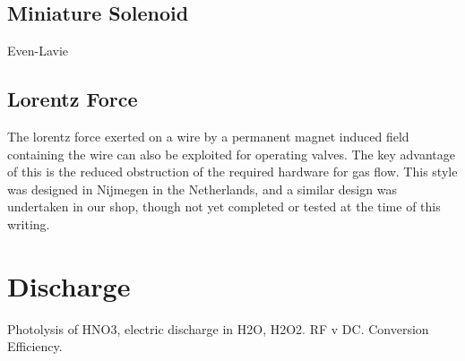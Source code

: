 \subsection{Miniature Solenoid}

Even-Lavie

\subsection{Lorentz Force}

The lorentz force exerted on a wire by a permanent magnet induced field containing the wire can also be exploited for operating valves.
The key advantage of this is the reduced obstruction of the required hardware for gas flow.
This style was designed in Nijmegen in the Netherlands, and a similar design was undertaken in our shop, though not yet completed or tested at the time of this writing.

\section{Discharge}

Photolysis of HNO3, electric discharge in H2O, H2O2. RF v DC. Conversion Efficiency.





\ifx\justbeingincluded\undefined

\fi
